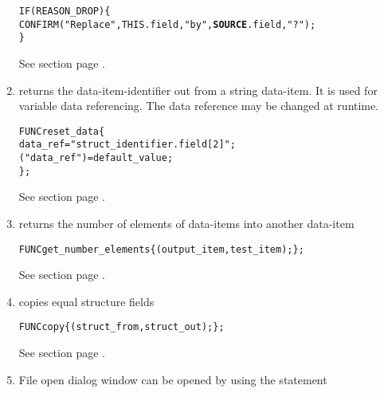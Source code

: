 \begin{enumerate}
\begin{boxedminipage}[t]{\linewidth}
\begin{alltt}
  IF( REASON_DROP )\{
    CONFIRM( "Replace ",THIS.field," by ",{\bfseries SOURCE}.field,"?" );
  \}
\end{alltt}
\end{boxedminipage}

See section  page \pageref{navigatordragndrop}. \\
\item \VAR{} returns the data-item-identifier out from a string data-item. 
It is used for variable data referencing. The data reference may be changed 
at runtime.

\begin{boxedminipage}[t]{\linewidth}
\begin{alltt}
  FUNC reset_data \{
    data_ref = "struct_identifier.field[2]";
    \VAR("data_ref") = default_value;
  \};
\end{alltt}
\end{boxedminipage}

See section  page \pageref{fudatastatements}. \\
\item \SIZE{} returns the number of elements of data-items into 
another data-item

\begin{boxedminipage}[t]{\linewidth}
\begin{alltt}
  FUNC get_number_elements \{ \SIZE(output_item, test_item); \};
\end{alltt}
\end{boxedminipage}

See section  page \pageref{fudatastatements}. \\
\item \ASSIGNCORR{} copies equal structure fields

\begin{boxedminipage}[t]{\linewidth}
\begin{alltt}
  FUNC copy \{ \ASSIGNCORR(struct_from, struct_out); \};
\end{alltt}
\end{boxedminipage}

See section  page \pageref{fudatastatements}. \\
\item File open dialog window can be opened by using the \OPEN{} statement


\end{enumerate}
